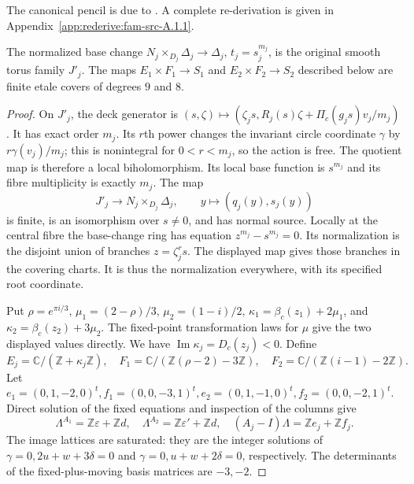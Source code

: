 The canonical pencil is due to \citet[Theorem~9.1]{AC2026}. A complete re-derivation is given in Appendix~\ref{app:rederive:fam-src-A.1.1}.


\begin{proposition}\label{fam:src:A.1.2}\label{fam:st:A.1.2}
The normalized base change $N_j\times_{D_j}\Delta_j\to\Delta_j$, $t_j=s_j^{m_j}$, is the original smooth torus family $J'_j$. The maps $E_1\times F_1\to S_1$ and $E_2\times F_2\to S_2$ described below are finite etale covers of degrees $9$ and $8$.
\end{proposition}

\begin{proof}
On $J'_j$, the deck generator is
$(s,\zeta)\mapsto(\zeta_js,R_j(s)\zeta+\Pi_c(g_js)v_j/m_j)$. It has exact order $m_j$. Its $r$th power changes the invariant circle coordinate $\gamma$ by $r\gamma(v_j)/m_j$; this is nonintegral for $0<r<m_j$, so the action is free. The quotient map is therefore a local biholomorphism. Its local base function is $s^{m_j}$ and its fibre multiplicity is exactly $m_j$. The map
\[
 J'_j\longrightarrow N_j\times_{D_j}\Delta_j,\qquad y\longmapsto(q_j(y),s_j(y))
\]
is finite, is an isomorphism over $s\ne0$, and has normal source. Locally at the central fibre the base-change ring has equation $z^{m_j}-s^{m_j}=0$. Its normalization is the disjoint union of branches $z=\zeta_j^rs$. The displayed map gives those branches in the covering charts. It is thus the normalization everywhere, with its specified root coordinate.

Put $\rho=e^{\pi i/3}$, $\mu_1=(2-\rho)/3$, $\mu_2=(1-i)/2$, $\kappa_1=\beta_c(z_1)+2\mu_1$, and $\kappa_2=\beta_c(z_2)+3\mu_2$. The fixed-point transformation laws for $\mu$ give the two displayed values directly. We have $\operatorname{Im}\kappa_j=D_c(z_j)<0$. Define
\[
 E_j=\mathbb C/(\mathbb Z+\kappa_j\mathbb Z),\quad
 F_1=\mathbb C/(\mathbb Z(\rho-2)-3\mathbb Z),\quad
 F_2=\mathbb C/(\mathbb Z(i-1)-2\mathbb Z).
\]
Let $e_1=(0,1,-2,0)^t,f_1=(0,0,-3,1)^t,e_2=(0,1,-1,0)^t,f_2=(0,0,-2,1)^t$. Direct solution of the fixed equations and inspection of the columns give
\[
 \Lambda^{A_1}=\mathbb Z\varepsilon+\mathbb Zd,\quad
 \Lambda^{A_2}=\mathbb Z\varepsilon'+\mathbb Zd,\quad
 (A_j-I)\Lambda=\mathbb Ze_j+\mathbb Zf_j.
\]
The image lattices are saturated: they are the integer solutions of $\gamma=0,2u+w+3\delta=0$ and $\gamma=0,u+w+2\delta=0$, respectively. The determinants of the fixed-plus-moving basis matrices are $-3,-2$.


\end{proof}
